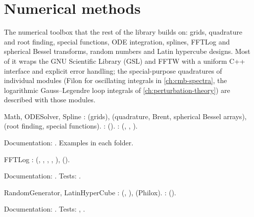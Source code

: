 \chapter{Numerical methods}\label{ch:numerics}

The numerical toolbox that the rest of the library builds on: grids, quadrature and root finding, special functions,
ODE integration, splines, FFTLog and spherical Bessel transforms, random numbers and Latin hypercube designs. Most of it
wraps the GNU Scientific Library (GSL) \cite{Galassi2009} and FFTW \cite{Frigo2005} with a uniform C++ interface and
explicit error handling; the special-purpose quadratures of individual modules (Filon \cite{Filon1929} for oscillating
integrals in \cref{ch:cmb-spectra}, the logarithmic Gauss--Legendre loop integrals of \cref{ch:perturbation-theory}) are
described with those modules.

\begin{modulebox}{Math, ODESolver, Spline}
:  (grids),  (quadrature, Brent, spherical Bessel
arrays),  (root finding, special functions).
:  ().
:  (, , ).\par
Documentation: . Examples in each folder.
\end{modulebox}
\begin{modulebox}{FFTLog}
:  (, ,
, , ), 
().\par
Documentation: . Tests: .
\end{modulebox}
\begin{modulebox}{RandomGenerator, LatinHyperCube}
:  (, ),
 (Philox).
:  ().\par
Documentation: . Tests: , .
\end{modulebox}

